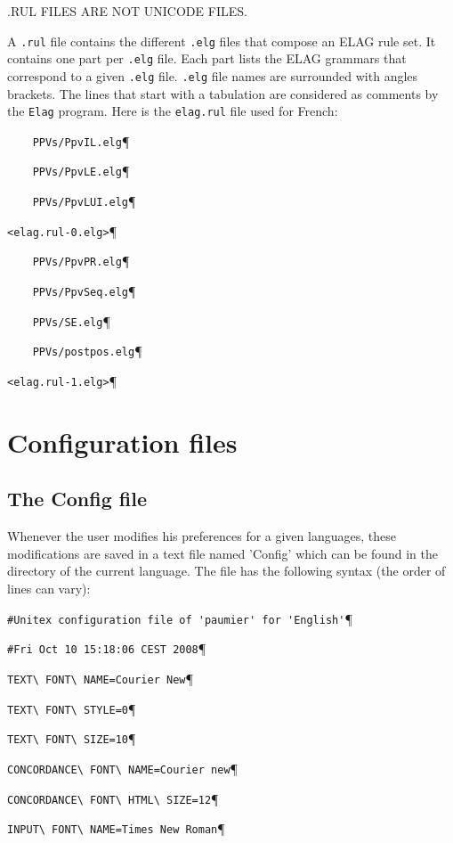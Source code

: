.RUL FILES ARE NOT UNICODE FILES.

\bigskip
\noindent A \verb$.rul$ file contains the different \verb$.elg$ files that compose an ELAG
rule set. It contains one part per \verb$.elg$ file. Each part lists the ELAG
grammars that correspond to a given \verb$.elg$ file. \verb$.elg$ file names are
surrounded with angles brackets. The lines that start with a tabulation are
considered as comments by the \verb+Elag+
program. Here is the
\verb$elag.rul$ file used for French:

\bigskip
\verb$    PPVs/PpvIL.elg$\P

\verb$    PPVs/PpvLE.elg$\P

\verb$    PPVs/PpvLUI.elg$\P

\verb$<elag.rul-0.elg>$\P

\verb$    PPVs/PpvPR.elg$\P

\verb$    PPVs/PpvSeq.elg$\P

\verb$    PPVs/SE.elg$\P

\verb$    PPVs/postpos.elg$\P

\verb$<elag.rul-1.elg>$\P

\section{Configuration files}
\subsection{The Config file}
Whenever the user modifies his preferences for a given languages, these
modifications are saved in a text file named 'Config' which can be found in the
directory of the current language. The file has the following syntax (the order
of lines can vary):


\bigskip
\verb$#Unitex configuration file of 'paumier' for 'English'$\P

\verb$#Fri Oct 10 15:18:06 CEST 2008$\P

\verb$TEXT\ FONT\ NAME=Courier New$\P

\verb$TEXT\ FONT\ STYLE=0$\P

\verb$TEXT\ FONT\ SIZE=10$\P

\verb$CONCORDANCE\ FONT\ NAME=Courier new$\P

\verb$CONCORDANCE\ FONT\ HTML\ SIZE=12$\P

\verb$INPUT\ FONT\ NAME=Times New Roman$\P


